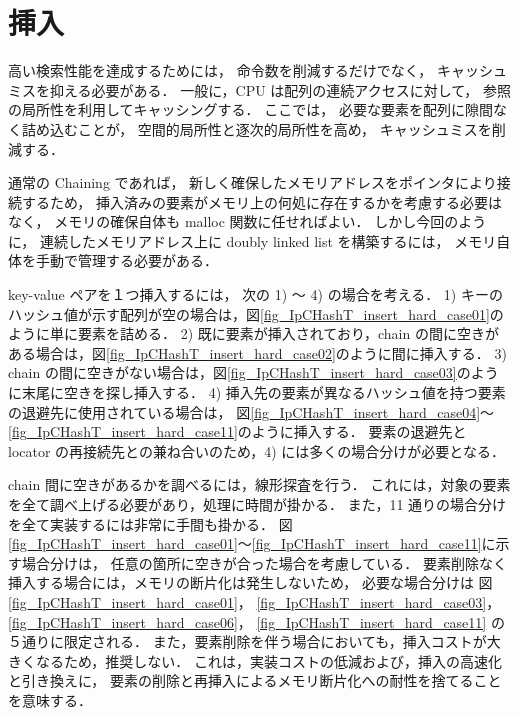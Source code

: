 \section{挿入}

高い検索性能を達成するためには，
命令数を削減するだけでなく，
キャッシュミスを抑える必要がある．
一般に，CPU は配列の連続アクセスに対して，
参照の局所性を利用してキャッシングする．
ここでは，
必要な要素を配列に隙間なく詰め込むことが，
空間的局所性と逐次的局所性を高め，
キャッシュミスを削減する．

通常の Chaining であれば，
新しく確保したメモリアドレスをポインタにより接続するため，
挿入済みの要素がメモリ上の何処に存在するかを考慮する必要はなく，
メモリの確保自体も malloc 関数に任せればよい．
しかし今回のように，
連続したメモリアドレス上に doubly linked list を構築するには，
メモリ自体を手動で管理する必要がある．

key-value ペアを１つ挿入するには，
次の 1) 〜 4) の場合を考える．
1) キーのハッシュ値が示す配列が空の場合は，図\ref{fig_IpCHashT_insert_hard_case01}のように単に要素を詰める．
2) 既に要素が挿入されており，chain の間に空きがある場合は，図\ref{fig_IpCHashT_insert_hard_case02}のように間に挿入する．
3) chain の間に空きがない場合は，図\ref{fig_IpCHashT_insert_hard_case03}のように末尾に空きを探し挿入する．
4) 挿入先の要素が異なるハッシュ値を持つ要素の退避先に使用されている場合は，
図\ref{fig_IpCHashT_insert_hard_case04}〜\ref{fig_IpCHashT_insert_hard_case11}のように挿入する．
要素の退避先と locator の再接続先との兼ね合いのため，4) には多くの場合分けが必要となる．

chain 間に空きがあるかを調べるには，線形探査を行う．
これには，対象の要素を全て調べ上げる必要があり，処理に時間が掛かる．
また，11 通りの場合分けを全て実装するには非常に手間も掛かる．
図\ref{fig_IpCHashT_insert_hard_case01}〜\ref{fig_IpCHashT_insert_hard_case11}に示す場合分けは，
任意の箇所に空きが合った場合を考慮している．
要素削除なく挿入する場合には，メモリの断片化は発生しないため，
必要な場合分けは
図\ref{fig_IpCHashT_insert_hard_case01}，
\ref{fig_IpCHashT_insert_hard_case03}，
\ref{fig_IpCHashT_insert_hard_case06}，
\ref{fig_IpCHashT_insert_hard_case11}
の５通りに限定される．
また，要素削除を伴う場合においても，挿入コストが大きくなるため，推奨しない．
これは，実装コストの低減および，挿入の高速化と引き換えに，
要素の削除と再挿入によるメモリ断片化への耐性を捨てることを意味する．

